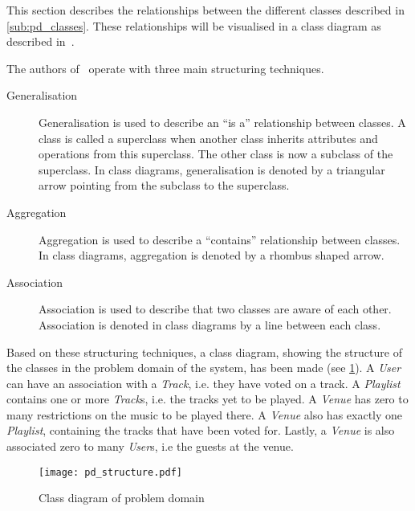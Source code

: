 This section describes the relationships between the different classes
described in \cref{sub:pd_classes}. These relationships will be
visualised in a class diagram as described
in~\cite{mathiassen2001objektorienteret}.

The authors of~\cite{mathiassen2001objektorienteret} operate with three
main structuring techniques.

\begin{description}
\item[Generalisation] Generalisation is used to describe an \enquote{is a}
  relationship between classes. A class is called a
  superclass when another class inherits attributes and operations
  from this superclass. The other class is now a subclass of the
  superclass. In class diagrams, generalisation is denoted by a
  triangular arrow pointing from the subclass to the superclass.
\item[Aggregation] Aggregation is used to describe a
  \enquote{contains} relationship between classes. In class diagrams,
  aggregation is denoted by a rhombus shaped arrow.
\item[Association] Association is used to describe that two classes
  are aware of each other. Association is denoted in class diagrams by
  a line between each class.
\end{description} 

Based on these structuring techniques, a class diagram, showing the structure of the classes in the problem domain of the system, has been made (see \cref{fig:pd_structure}). A \textit{User} can have an association with a \textit{Track}, i.e. they have voted on a track. A \textit{Playlist} contains one or more \textit{Track}s, i.e. the tracks yet to be played. A \textit{Venue} has zero to many restrictions on the music to be played there. A \textit{Venue} also has exactly one \textit{Playlist}, containing the tracks that have been voted for. Lastly, a \textit{Venue} is also associated zero to many \textit{User}s, i.e the guests at the venue.

\begin{figure}[htbp]
  \centering
  \texttt{[image: pd\_structure.pdf]}
  \caption{Class diagram of problem domain}\label{fig:pd_structure}
\end{figure}
